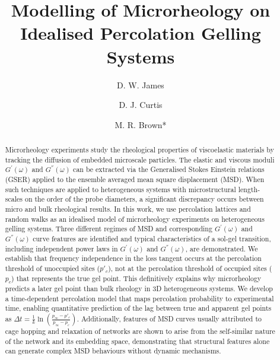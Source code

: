 \documentclass[%
 aip,
 amsmath,amssymb,
reprint, onecolumn %
]{revtex4-1}
\begin{document}

\title{Modelling of Microrheology on Idealised Percolation Gelling Systems}
\author{D. W. James}
\author{D. J. Curtis}%
\author{M. R. Brown*}
%
%


\begin{abstract}
Microrheology experiments study the rheological properties of viscoelastic materials by tracking the diffusion of embedded microscale particles. The elastic and viscous moduli $G^{'}(\omega)$ and $G^{''}(\omega)$ can be extracted via the Generalised Stokes Einstein relations (GSER) applied to the ensemble averaged mean square displacement (MSD). When such techniques are applied to heterogeneous systems with microstructural length-scales on the order of the probe diameters, a significant discrepancy occurs between micro and bulk rheological results. In this work, we use percolation lattices and random walks as an idealised model of microrheology experiments on heterogeneous gelling systems. Three different regimes of MSD and corresponding $G^{'}(\omega)$ and $G^{''}(\omega)$ curve features are identified and typical characteristics of a sol-gel transition, including independent power laws in $G^{'}(\omega)$ and $G^{''}(\omega)$, are demonstrated. We establish that frequency independence in the loss tangent occurs at the percolation threshold of unoccupied sites ($p'_c$), not at the percolation threshold of occupied sites ($p_c$) that represents the true gel point. This definitively explains why microrheology predicts a later gel point than bulk rheology in 3D heterogeneous systems. We develop a time-dependent percolation model that maps percolation probability to experimental time, enabling quantitative prediction of the lag between true and apparent gel points as $\Delta t = \frac{1}{k}\ln\left(\frac{p_\infty-p'_c}{p_\infty-p_c}\right)$. Additionally, features of MSD curves usually attributed to cage hopping and relaxation of networks are shown to arise from the self-similar nature of the network and its embedding space, demonstrating that structural features alone can generate complex MSD behaviours without dynamic mechanisms.
\end{abstract}

\maketitle
\end{document}
